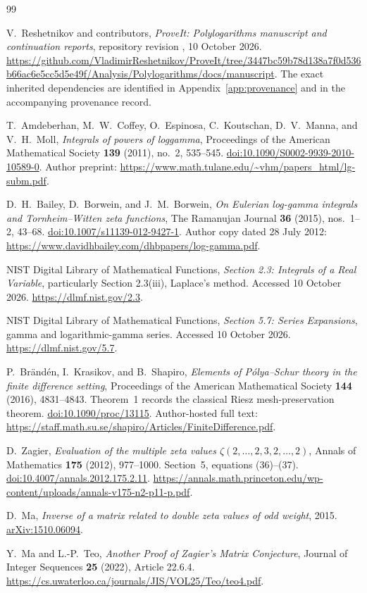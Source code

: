 \begin{thebibliography}{99}

V.~Reshetnikov and contributors,
\emph{ProveIt: Polylogarithms manuscript and continuation reports},
repository revision \sourcecommit, 10 October 2026.
\url{https://github.com/VladimirReshetnikov/ProveIt/tree/3447bc59b78d138a7f0d536b66ac6e5cc5d5e49f/Analysis/Polylogarithms/docs/manuscript}.
The exact inherited dependencies are identified in Appendix~\ref{app:provenance}
and in the accompanying provenance record.

T.~Amdeberhan, M.~W.~Coffey, O.~Espinosa, C.~Koutschan,
D.~V.~Manna, and V.~H.~Moll,
\emph{Integrals of powers of loggamma},
Proceedings of the American Mathematical Society \textbf{139} (2011),
no.~2, 535--545.
\href{https://doi.org/10.1090/S0002-9939-2010-10589-0}{doi:10.1090/S0002-9939-2010-10589-0}.
Author preprint:
\url{https://www.math.tulane.edu/~vhm/papers_html/lg-subm.pdf}.

D.~H.~Bailey, D.~Borwein, and J.~M.~Borwein,
\emph{On Eulerian log-gamma integrals and Tornheim--Witten zeta functions},
The Ramanujan Journal \textbf{36} (2015), nos.~1--2, 43--68.
\href{https://doi.org/10.1007/s11139-012-9427-1}{doi:10.1007/s11139-012-9427-1}.
Author copy dated 28 July 2012:
\url{https://www.davidhbailey.com/dhbpapers/log-gamma.pdf}.

NIST Digital Library of Mathematical Functions,
\emph{Section 2.3: Integrals of a Real Variable}, particularly
Section 2.3(iii), Laplace's method. Accessed 10 October 2026.
\url{https://dlmf.nist.gov/2.3}.

NIST Digital Library of Mathematical Functions,
\emph{Section 5.7: Series Expansions}, gamma and logarithmic-gamma
series. Accessed 10 October 2026.
\url{https://dlmf.nist.gov/5.7}.

P.~Br\"and\'en, I.~Krasikov, and B.~Shapiro,
\emph{Elements of P\'olya--Schur theory in the finite difference setting},
Proceedings of the American Mathematical Society \textbf{144} (2016),
4831--4843. Theorem~1 records the classical Riesz mesh-preservation theorem.
\href{https://doi.org/10.1090/proc/13115}{doi:10.1090/proc/13115}.
Author-hosted full text:
\url{https://staff.math.su.se/shapiro/Articles/FiniteDifference.pdf}.

D.~Zagier,
\emph{Evaluation of the multiple zeta values
$\zeta(2,\ldots,2,3,2,\ldots,2)$},
Annals of Mathematics \textbf{175} (2012), 977--1000.
Section~5, equations (36)--(37).
\href{https://doi.org/10.4007/annals.2012.175.2.11}{doi:10.4007/annals.2012.175.2.11}.
\url{https://annals.math.princeton.edu/wp-content/uploads/annals-v175-n2-p11-p.pdf}.

D.~Ma,
\emph{Inverse of a matrix related to double zeta values of odd weight},
2015. \href{https://arxiv.org/abs/1510.06094}{arXiv:1510.06094}.

Y.~Ma and L.-P.~Teo,
\emph{Another Proof of Zagier's Matrix Conjecture},
Journal of Integer Sequences \textbf{25} (2022), Article 22.6.4.
\url{https://cs.uwaterloo.ca/journals/JIS/VOL25/Teo/teo4.pdf}.

\end{thebibliography}
